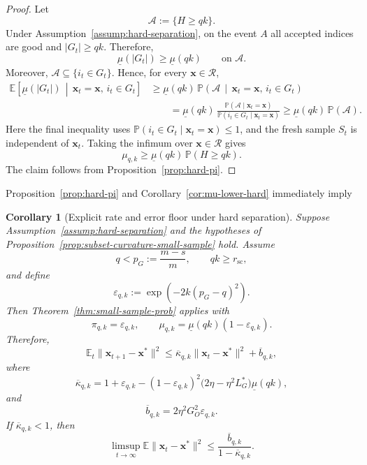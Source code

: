 \documentclass[11pt]{article}
\newcommand{\ve}[1]{\mathbf{#1}}
\newtheorem{cor}{Corollary}
\begin{document}
\begin{proof}
Let
\[
\mathcal{A}:=\{H\ge qk\}.
\]
Under Assumption~\ref{assump:hard-separation}, on the event \(A\) all
accepted indices are good and
$|G_t|\ge qk.$
Therefore,
\[
\underline{\mu}(|G_t|)
\ge
\underline{\mu}(qk)
\qquad\text{on }\mathcal{A}.
\]
Moreover, \(\mathcal{A}\subseteq\{i_t\in G_t\}\). Hence, for every
\(\ve{x}\in\mathcal R\),
\begin{align*}
\mathbb{E}\!\left[
\underline{\mu}(|G_t|)
\,\middle|\,
\ve{x}_t=\ve{x},\,i_t\in G_t
\right] &\ge
\underline{\mu}(qk)\,
\mathbb{P}\!\left(
\mathcal{A}
\,\middle|\,
\ve{x}_t=\ve{x},\,i_t\in G_t
\right) \\
&\qquad=
\underline{\mu}(qk)\,
\frac{
\mathbb{P}(\mathcal{A}\mid\ve{x}_t=\ve{x})
}{
\mathbb{P}(i_t\in G_t\mid\ve{x}_t=\ve{x})
} \ge
\underline{\mu}(qk)\,
\mathbb{P}(\mathcal{A}).
\end{align*}
Here the final inequality uses
\(\mathbb{P}(i_t\in G_t\mid\ve{x}_t=\ve{x})\le1\), and the fresh sample
\(S_t\) is independent of \(\ve{x}_t\). Taking the infimum over \(\ve{x}\in\mathcal R\) gives
\[
\mu_{q,k}
\ge
\underline{\mu}(qk)\,
\mathbb{P}(H\ge qk).
\]
The claim follows from Proposition~\ref{prop:hard-pi}.
\end{proof}

Proposition~\ref{prop:hard-pi} and
Corollary~\ref{cor:mu-lower-hard} immediately imply

\begin{cor}[Explicit rate and error floor under hard separation]
\label{cor:hard-separation-rate}
Suppose Assumption~\ref{assump:hard-separation} and the hypotheses of
Proposition~\ref{prop:subset-curvature-small-sample} hold. Assume
\[
q<p_G:=\frac{m-s}{m},
\qquad
qk\ge r_{\mathrm{sc}},
\]
and define
\[
\varepsilon_{q,k}
:=
\exp\left(-2k(p_G-q)^2\right).
\]
Then Theorem~\ref{thm:small-sample-prob} applies with
\[
\pi_{q,k}
=
\varepsilon_{q,k},
\qquad
\mu_{q,k}
=
\underline{\mu}(qk)(1-\varepsilon_{q,k}).
\]
Therefore,
\[
\mathbb E_t\|\ve{x}_{t+1}-\ve{x}^*\|^2
\le
\overline{\kappa}_{q,k}\|\ve{x}_t-\ve{x}^*\|^2
+
\overline b_{q,k},
\]
where
\[
\overline{\kappa}_{q,k}
=
1+\varepsilon_{q,k}
-
(1-\varepsilon_{q,k})^2
\bigl(2\eta-\eta^2L_G^*\bigr)
\underline{\mu}(qk),
\]
and
\[
\overline b_{q,k}
=
2\eta^2G_O^2\varepsilon_{q,k}.
\]
If \(\overline{\kappa}_{q,k}<1\), then
\[
\limsup_{t\to\infty}
\mathbb E\|\ve{x}_t-\ve{x}^*\|^2
\le
\frac{\overline b_{q,k}}
{1-\overline{\kappa}_{q,k}}.
\]
\end{cor}
\end{document}
